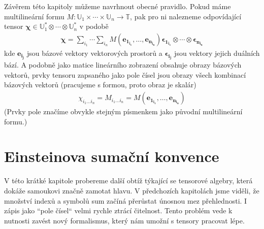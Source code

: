 \documentclass[a5paper,12pt]{amsbook}
\theoremstyle{definition}
\newcommand{\myvec}[1]{\bm{#1}}
\newcommand{\myspace}[1]{\mathbb{#1}}
\begin{document}
\medskip\noindent
Závěrem této kapitoly můžeme navrhnout obecné pravidlo. Pokud máme multilineární formu
$M: \myspace{U}_1\times\cdots\times\myspace{U}_n\rightarrow\myspace{T}$, pak pro ni
nalezneme odpovídající tensor $\myvec{\chi}\in\myspace{U}_1^*\otimes\cdots\otimes\myspace{U}_n^*$
v podobě
\begin{equation*}
\begin{split}
\myvec{\chi} = \sum_{i_1}\cdots\sum_{i_n}
M(\myvec{e_{1_{i_1}}}, \hdots, \myvec{e_{n_{i_n}}})
  \myvec{\epsilon_{1_{i_1}}}\otimes\cdots\otimes\myvec{\epsilon_{n_{i_n}}}
\end{split}
\end{equation*}
kde $\myvec{e_{i_j}}$ jsou bázové vektory vektorových prostorů a $\myvec{\epsilon_{i_j}}$
jsou vektory jejich duálních bází. A podobně jako matice lineárního zobrazení obsahuje
obrazy bázových vektorů, prvky tensoru zapsaného jako pole čísel jsou obrazy všech kombinací
bázových vektorů (pracujeme s formou, proto obraz je skalár)
\begin{equation*}
\begin{split}
\chi_{i_1\hdots i_n} = M_{i_1\hdots i_n} = M(\myvec{e_{1_{i_1}}}, \hdots, \myvec{e_{n_{i_n}}})
\end{split}
\end{equation*}
(Prvky pole značíme obvykle stejným písmenkem jako původní multilineární formu.)

\section{Einsteinova sumační konvence}

\noindent
V této krátké kapitole probereme další obtíž týkající se tensorové algebry, která dokáže samoukovi
značně zamotat hlavu. V předchozích kapitolách jsme viděli, že množství indexů a symbolů sum
začíná přerůstat únosnou mez přehlednosti. I zápis jako ``pole čísel`` velmi rychle ztrácí čitelnost.
Tento problém vede k nutnosti zavést nový formalismus, který nám umožní s tensory pracovat lépe.
\end{document}
